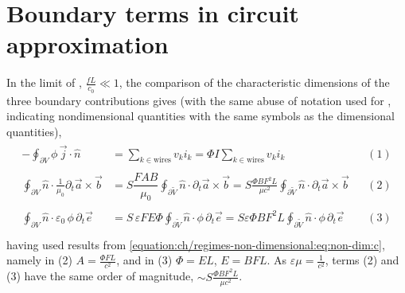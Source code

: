 \documentclass[letterpaper,10pt,english]{jupyterBook}
\begin{document}
\section{Boundary terms in circuit approximation}
\label{\detokenize{ch/circuits-energy:boundary-terms-in-circuit-approximation}}\label{\detokenize{ch/circuits-energy:classical-electromagnetism-circuits-energy-boundary}}
\sphinxAtStartPar
In the limit of {\hyperref[\detokenize{ch/regimes-slow:classical-electromagnetism-regimes-slow}]{}}, \(\frac{f L}{c_0} \ll 1\), the comparison of the characteristic dimensions of the three boundary contributions gives (with the same abuse of notation used for {\hyperref[\detokenize{ch/regimes-non-dimensional:classical-electromagnetism-regimes-non-dimensional}]{}}, indicating non\sphinxhyphen{}dimensional quantities with the same symbols as the dimensional quantities),
\begin{equation*}
\begin{split}\begin{aligned}
  - \oint_{\partial V} \phi \, \vec{j} \cdot \hat{n} & = \sum_{k \in \text{wires}} v_k i_k = \Phi I \sum_{k \in \text{wires}} v_k i_k && (1) \\ \\
  \oint_{\partial V} \hat{n} \cdot \frac{1}{\mu_0} \partial_t \vec{a} \times \vec{b} & = S \dfrac{ F A B }{\mu_0} \oint_{\partial \widetilde{V}} \hat{n} \cdot \partial_t \vec{a} \times \vec{b} = S \frac{\Phi B F^2 L}{\mu c^2}  \oint_{\partial \widetilde{V}} \hat{n} \cdot \partial_t \vec{a} \times \vec{b}  && (2) \\ \\
  \oint_{\partial V} \hat{n} \cdot \varepsilon_0 \, \phi\, \partial_t \vec{e} & = S \, \varepsilon F E \Phi \oint_{\partial \widetilde{V}} \hat{n} \cdot \phi\, \partial_t \vec{e} = S \varepsilon \Phi B F^2 L \oint_{\partial \widetilde{V}} \hat{n} \cdot \phi\, \partial_t \vec{e} && (3) \\
\end{aligned}\end{split}
\end{equation*}
\sphinxAtStartPar
having used results from \eqref{equation:ch/regimes-non-dimensional:eq:non-dim:c}, namely in (2) \(A = \frac{\Phi F L}{c^2}\), and in (3) \( \Phi = E L\), \(E = B F L\). As \(\varepsilon \mu = \frac{1}{c^2}\), terms (2) and (3) have the same order of magnitude, \(\sim S \frac{\Phi B F^2 L}{\mu c^2}\).
\end{document}
